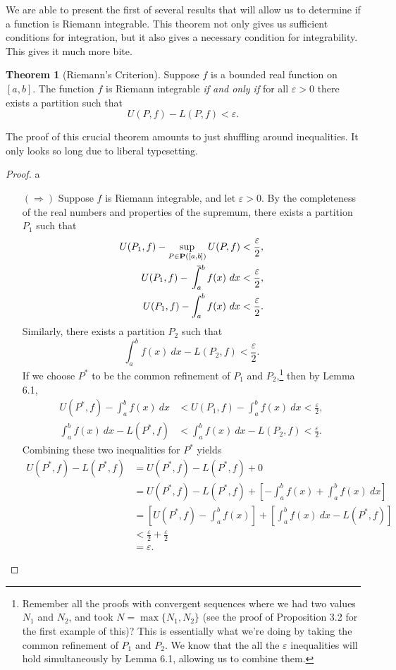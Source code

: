 \documentclass{article}
\def\upint{\mathchoice%
	{\mkern13mu\overline{\vphantom{\intop}\mkern7mu}\mkern-20mu}%
	{\mkern7mu\overline{\vphantom{\intop}\mkern7mu}\mkern-14mu}%
	{\mkern7mu\overline{\vphantom{\intop}\mkern7mu}\mkern-14mu}%
	{\mkern7mu\overline{\vphantom{\intop}\mkern7mu}\mkern-14mu}%
	\int}
\theoremstyle{definition}
\newtheorem{theorem}{Theorem}[section]
\begin{document}
	We are able to present the first of several results that will allow us to determine if a function is Riemann integrable. This theorem not only gives us sufficient conditions for integration, but it also gives a necessary condition for integrability. This gives it much more bite. 
	\begin{theorem}[Riemann's Criterion]
		Suppose $ f $ is a bounded real function on $ [a,b] $. The function $ f $ is Riemann integrable \textit{if and only if} for all $ \varepsilon>0 $ there exists a partition such that $$ U(P,f)-L(P,f)<\varepsilon.$$
	\end{theorem} The proof of this crucial theorem amounts to just shuffling around inequalities. It only looks so long due to liberal typesetting.  
	\begin{proof}{\color{white}a}
		\begin{enumerate}
			\item [$ (\Longrightarrow) $] Suppose $ f $ is Riemann integrable, and let $ \varepsilon>0 $. By the completeness of the real numbers and properties of the supremum, there exists a partition $ P_1 $ such that \begin{align*}
				U(P_1,f)-\sup\limits_{P\in\textbf{P}([a,b])}U(P,f)&<\frac{\varepsilon}{2},\\
				U(P_1,f)-\upint_a^b f(x)\ dx&<\frac{\varepsilon}{2},\\
				U(P_1,f)-\int_a^b f(x)\ dx&<\frac{\varepsilon}{2}.
			\end{align*} 
			Similarly, there exists a partition $ P_2 $ such that $$\int_a^bf(x)\ dx-L(P_2,f)<\frac{\varepsilon}{2}. $$ If we choose $ P^* $ to be the common refinement of $ P_1 $ and $ P_2 $,\footnote{Remember all the proofs with convergent sequences where we had two values $ N_1 $ and $ N_2 $, and took $ N=\max\{N_1,N_2\} $ (see the proof of Proposition 3.2 for the first example of this)? This is essentially what we're doing by taking the common refinement of $ P_1 $ and $ P_2 $. We know that the all the $ \varepsilon $ inequalities will hold simultaneously by Lemma 6.1, allowing us to combine them.} then by Lemma 6.1, \begin{align*}
				U(P^*,f)-\int_a^b f(x)\ dx&<U(P_1,f)-\int_a^b f(x)\ dx<\frac{\varepsilon}{2},\\\int_a^bf(x)\ dx-L(P^*,f)&<\int_a^bf(x)\ dx-L(P_2,f)<\frac{\varepsilon}{2}.
			\end{align*}
			Combining these two inequalities for $ P^* $ yields
			\begin{align*}
				U(P^*,f)-L(P^*,f)&=U(P^*,f)-L(P^*,f)+0\\&=U(P^*,f)-L(P^*,f)+\left[-\int_a^b f(x)+\int_a^bf(x)\ dx\right]\\&=\left[U(P^*,f)-\int_a^b f(x)\right]+\left[\int_a^bf(x)\ dx-L(P^*,f)\right]\\&<\frac{\varepsilon}{2}+\frac{\varepsilon}{2}\\&=\varepsilon.

\end{align*}
\end{enumerate}
\end{proof}
\end{document}
